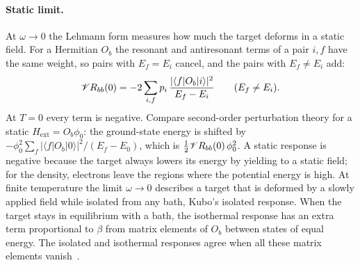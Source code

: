 \paragraph{Static limit.} At $\omega \to 0$ the Lehmann form measures how much the target deforms in a static field. For a Hermitian $O_b$ the resonant and antiresonant terms of a pair $i, f$ have the same weight, so pairs with $E_f = E_i$ cancel, and the pairs with $E_f \neq E_i$ add:
\begin{equation*}
  \mathscr{V} R_{bb}(0) = -2\sum_{i,f}p_i\,\frac{|\langle f|O_b|i\rangle|^2}{E_f - E_i} \qquad (E_f \neq E_i) .
\end{equation*}
At $T = 0$ every term is negative. Compare second-order perturbation theory for a static $H_{\mathrm{ext}} = O_b\phi_0$: the ground-state energy is shifted by $-\phi_0^2\sum_f|\langle f|O_b|0\rangle|^2/(E_f - E_0)$, which is $\tfrac12\mathscr{V} R_{bb}(0)\,\phi_0^2$. A static response is negative because the target always lowers its energy by yielding to a static field; for the density, electrons leave the regions where the potential energy is high. At finite temperature the limit $\omega \to 0$ describes a target that is deformed by a slowly applied field while isolated from any bath, Kubo's isolated response. When the target stays in equilibrium with a bath, the isothermal response has an extra term proportional to $\beta$ from matrix elements of $O_b$ between states of equal energy. The isolated and isothermal responses agree when all these matrix elements vanish~\cite{kubo1957statistical}.

